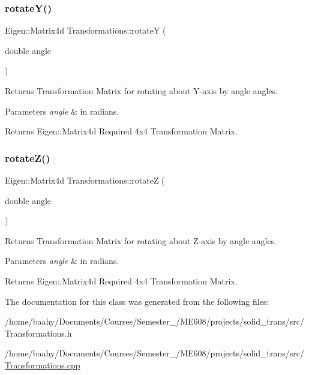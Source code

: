 \subsubsection{\texorpdfstring{rotate\+Y()}{rotateY()}}
{\footnotesize\ttfamily Eigen\+::\+Matrix4d Transformations\+::rotateY (\begin{DoxyParamCaption}\item[{double}]{angle }\end{DoxyParamCaption})}



Returns Transformation Matrix for rotating about Y-\/axis by \textquotesingle{}angle\textquotesingle{} angles. 


\begin{DoxyParams}{Parameters}
{\em angle} & in radians. \\
\hline
\end{DoxyParams}
\begin{DoxyReturn}{Returns}
Eigen\+::\+Matrix4d Required 4x4 Transformation Matrix. 
\end{DoxyReturn}
\mbox{\label{classTransformations_af700b3a14795f2483e73dac667138907}} 
\subsubsection{\texorpdfstring{rotate\+Z()}{rotateZ()}}
{\footnotesize\ttfamily Eigen\+::\+Matrix4d Transformations\+::rotateZ (\begin{DoxyParamCaption}\item[{double}]{angle }\end{DoxyParamCaption})}



Returns Transformation Matrix for rotating about Z-\/axis by \textquotesingle{}angle\textquotesingle{} angles. 


\begin{DoxyParams}{Parameters}
{\em angle} & in radians. \\
\hline
\end{DoxyParams}
\begin{DoxyReturn}{Returns}
Eigen\+::\+Matrix4d Required 4x4 Transformation Matrix. 
\end{DoxyReturn}


The documentation for this class was generated from the following files\+:\begin{DoxyCompactItemize}
\item 
/home/baahy/\+Documents/\+Courses/\+Semester\+\_/\+M\+E608/projects/solid\+\_\+trans/src/Transformations.\+h\item 
/home/baahy/\+Documents/\+Courses/\+Semester\+\_/\+M\+E608/projects/solid\+\_\+trans/src/\hyperlink{Transformations_8cpp}{Transformations.\+cpp}\end{DoxyCompactItemize}
